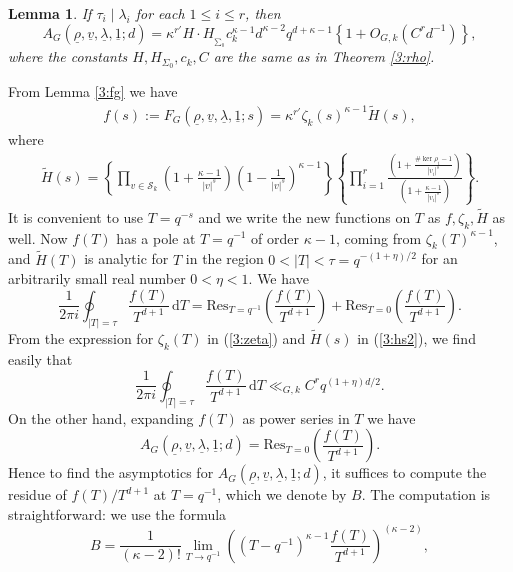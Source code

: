 \documentclass[12pt]{amsart}
\theoremstyle{plain}
\newtheorem{lemma}{Lemma}
\begin{document}
\begin{lemma} \label{3:ad2} If $\tau_i \mid \lambda_i$ for each $1 \le i \le r$, then
\[{A_{G}({\underline{{\rho}}},{\underline{{v}}},{\underline{{\lambda}}},{\underline{{1}}};d)}=\kappa^{r'} H \cdot H_{_{\sum_0}}c_k^{\kappa-1}d^{\kappa-2} q^{d+\kappa-1} \left\{1+O_{G,k}\left(C^rd^{-1}\right)\right\}, \]
where the constants $H,H_{\Sigma_0},c_k,C$ are the same as in Theorem \ref{3:rho}.
\end{lemma}

 From Lemma \ref{3:fg} we have
\begin{eqnarray*} \label{3:fs1} f(s):=F_G({\underline{{\rho}}},{\underline{{v}}},{\underline{{\lambda}}},{\underline{{1}}};s)=\kappa^{r'} \zeta_k(s)^{\kappa-1} \widetilde{H}(s),\end{eqnarray*}
where
\begin{eqnarray} \label{3:hs2} \widetilde{H}(s)=\left\{ \prod_{v \in {\mathcal{S}_k}} \left(1+\frac{\kappa-1}{|v|^s}\right)
\left(1-\frac{1}{|v|^s}\right)^{\kappa-1} \right\}  \left\{\prod_{i=1}^r\frac{\left(1+\frac{\# \ker \rho_i-1}{|v_i|^s}\right)}{\left(1+
\frac{\kappa-1}{|v_i|^s}\right)}\right\}. \end{eqnarray}
It is convenient to use $T=q^{-s}$ and we write the new functions on $T$ as $f,\zeta_k, \widetilde{H}$ as well. Now $f(T)$ has a pole at $T=q^{-1}$ of order $\kappa-1$, coming from $\zeta_k(T)^{\kappa-1}$, and $\widetilde{H}(T)$ is analytic for $T$ in the region $0<|T|<\tau=q^{-(1+\eta)/2}$ for an arbitrarily small real number $0<\eta<1$. We have
\[\frac{1}{2 \pi i} \oint_{|T|=\tau} \frac{f(T)}{T^{d+1}}\, {\mathrm{d}} T=\mathrm{Res}_{T=q^{-1}}\left(\frac{f(T)}{T^{d+1}}\right)+
\mathrm{Res}_{T=0}\left(\frac{f(T)}{T^{d+1}}\right). \]
From the expression for $\zeta_k(T)$ in (\ref{3:zeta}) and $\widetilde{H}(s)$ in (\ref{3:hs2}), we find easily that
\[\frac{1}{2 \pi i} \oint_{|T|=\tau} \frac{f(T)}{T^{d+1}}\, {\mathrm{d}} T \ll_{G,k} C^{r} q^{(1+\eta)d/2}. \]
On the other hand, expanding $f(T)$ as power series in $T$ we have
\[{A_{G}({\underline{{\rho}}},{\underline{{v}}},{\underline{{\lambda}}},{\underline{{1}}};d)}=\mathrm{Res}_{T=0}\left(\frac{f(T)}{T^{d+1}}\right). \]
Hence to find the asymptotics for ${A_{G}({\underline{{\rho}}},{\underline{{v}}},{\underline{{\lambda}}},{\underline{{1}}};d)}$, it suffices to compute the residue of $f(T)/T^{d+1}$ at $T=q^{-1}$, which we denote by $B$. The computation is straightforward: we use the formula
\[B=\frac{1}{(\kappa-2)!} \lim_{T \to q^{-1}} \left( (T-q^{-1})^{\kappa-1} \frac{f(T)}{T^{d+1}} \right)^{(\kappa-2)},\]
\end{document}
